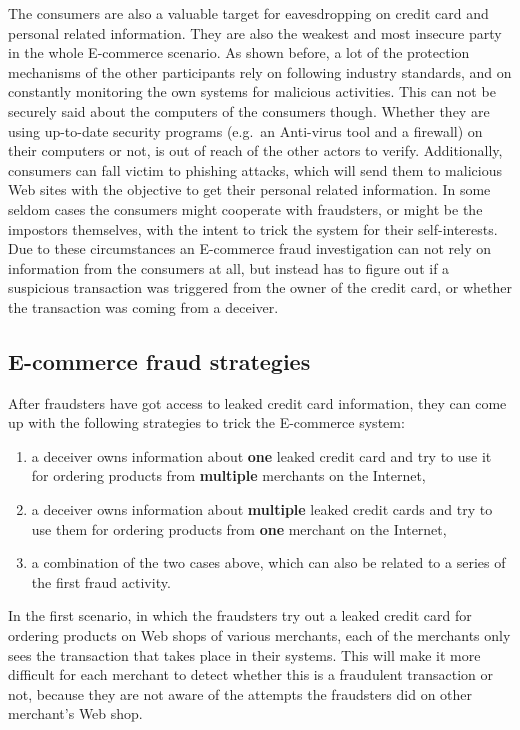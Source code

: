 The consumers are also a valuable target for eavesdropping on credit card and personal related information. They are also the weakest and most insecure party in the whole \gls{E-commerce} scenario. As shown before, a lot of the protection mechanisms of the other participants rely on following industry standards, and on constantly monitoring the own systems for malicious activities. This can not be securely said about the computers of the consumers though. Whether they are using up-to-date security programs (e.g.\ an Anti-virus tool and a firewall) on their computers or not, is out of reach of the other actors to verify. Additionally, consumers can fall victim to phishing attacks, which will send them to malicious Web sites with the objective to get their personal related information. In some seldom cases the consumers might cooperate with fraudsters, or might be the impostors themselves, with the intent to trick the system for their self-interests. Due to these circumstances an \gls{E-commerce} fraud investigation can not rely on information from the consumers at all, but instead has to figure out if a suspicious transaction was triggered from the owner of the credit card, or whether the transaction was coming from a deceiver.


\subsection{\Gls{E-commerce} fraud strategies}
\label{subsec:strategies_fraudster}

After fraudsters have got access to leaked credit card information, they can come up with the following strategies to trick the \gls{E-commerce} system:\@

\begin{enumerate}
  \item a deceiver owns information about \textbf{one} leaked credit card and try to use it for ordering products from \textbf{multiple} merchants on the Internet,
  \item a deceiver owns information about \textbf{multiple} leaked credit cards and try to use them for ordering products from \textbf{one} merchant on the Internet,
  \item a combination of the two cases above, which can also be related to a series of the first fraud activity.
\end{enumerate}

In the first scenario, in which the fraudsters try out a leaked credit card for ordering products on Web shops of various merchants, each of the merchants only sees the transaction that takes place in their systems. This will make it more difficult for each merchant to detect whether this is a fraudulent transaction or not, because they are not aware of the attempts the fraudsters did on other merchant's Web shop. \\

